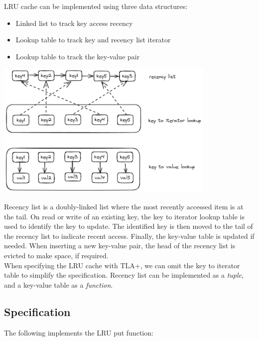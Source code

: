 LRU cache can be implemented using three data structures: 
\begin{itemize}
    \item Linked list to track key access recency 
    \item Lookup table to track key and recency list iterator 
    \item Lookup table to track the key-value pair
\end{itemize}

\begin{center}
\includegraphics[width=300pt]{lru}
\end{center}

Recency list is a doubly-linked list where the most recently accessed item is at
the tail. On read or write of an existing key, the key to iterator lookup table
is used to identify the key to update. The identified key is then moved to the
tail of the recency list to indicate recent access. Finally, the key-value table
is updated if needed. When inserting a new key-value pair, the head of the
recency list is evicted to make space, if required.\\

When specifying the LRU cache with TLA+, we can omit the key to iterator table
to simplify the specification. Recency list can be implemented as a
\textit{tuple}, and a key-value table as a \textit{function}.\\

\subsection{Specification}

The following implements the LRU put function:\\

